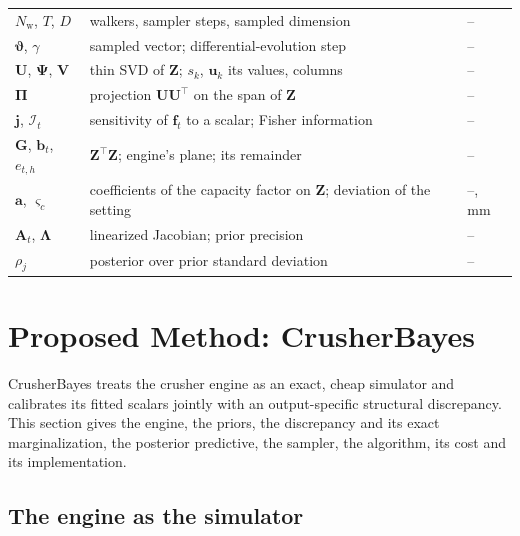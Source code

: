 \documentclass[journal]{IEEEtran}
\begin{document}
\begin{table}[!t]
\begin{tabular}{@{}l>{\raggedright\arraybackslash}p{}l@{}}
$N_{\mathrm w}$, $T$, $D$ & walkers, sampler steps, sampled dimension & -- \\
$\boldsymbol\vartheta$, $\gamma$ & sampled vector; differential-evolution step & -- \\
$\mathbf U$, $\boldsymbol\Psi$, $\mathbf V$ & thin SVD of $\mathbf Z$; $s_k$, $\mathbf u_k$ its values, columns & -- \\
$\boldsymbol\Pi$ & projection $\mathbf U\mathbf U^{\top}$ on the span of $\mathbf Z$ & -- \\
$\mathbf j$, $\mathcal I_t$ & sensitivity of $\mathbf f_t$ to a scalar; Fisher information & -- \\
$\mathbf G$, $\mathbf b_t$, $e_{t,h}$ & $\mathbf Z^{\top}\mathbf Z$; engine's plane; its remainder & -- \\
$\mathbf a$, $\varsigma_c$ & coefficients of the capacity factor on $\mathbf Z$; deviation of the setting & --, mm \\
$\mathbf A_t$, $\boldsymbol\Lambda$ & linearized Jacobian; prior precision & -- \\
$\rho_j$ & posterior over prior standard deviation & -- \\
\bottomrule
\end{tabular}
\end{table}

\section{Proposed Method: CrusherBayes}\label{sec:method}

CrusherBayes treats the crusher engine as an exact, cheap simulator and calibrates its fitted scalars jointly with an
output-specific structural discrepancy. This section gives the engine, the priors, the discrepancy and its exact
marginalization, the posterior predictive, the sampler, the algorithm, its cost and its implementation.

\subsection{The engine as the simulator}
\end{document}
